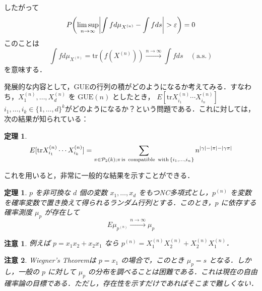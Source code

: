 \documentclass{ltjsarticle}
\makeatletter
\theoremstyle{mystyle1}
\newtheorem{thm}[dfn]{定理}
\theoremstyle{mystyle2}
\newtheorem{note*}{注意}
\theoremstyle{mystyle3}
\renewenvironment{proof}[1][\proofname]{\par
  \pushQED{\qed}%
  \normalfont
  \topsep6\p@\@plus6\p@ \trivlist
  \item[\hskip\labelsep{\bfseries\sffamily #1}]\ignorespaces
}{%
  \popQED\endtrivlist\@endpefalse
}
\renewcommand\proofname{証明}
\makeatother
\begin{document}
\begin{proof}
\begin{equation}
    \end{equation}
    したがって
    \begin{equation}
        P\mleft(\limsup_{n\to\infty}\mleft|\int f d\mu_{X^{(n)}}-\int f ds\mright|>\varepsilon\mright)=0
    \end{equation}
    このことは
    \begin{equation}
        \int f d\mu_{X^{(n)}}=\mathrm{tr}(f(X^{(n)}))\overset{n\to\infty}{\longrightarrow}\int f ds\quad(\textrm{a.s.})
    \end{equation}
    を意味する．
\end{proof}

発展的な内容として，GUEの行列の積がどのようになるか考えてみる．すなわち，$X_1^{(n)},\ldots,X_d^{(n)}$ を $\mathrm{GUE}(n)$ としたとき， $E[\mathrm{tr}X^{(n)}_{i_1}\cdots X^{(n)}_{i_n}]$ $i_1,\ldots,i_k\in\{1,\ldots, d\}^k$がどのようになるか？という問題である．これに対しては，次の結果が知られている：

\begin{thm}
    \begin{equation}
        E[\mathrm{tr}X^{(n)}_{i_1}\cdots X^{(n)}_{i_k}]=\sum_{\pi\in\mathcal{P}_2(k);\pi\, \textrm{is\, compatible\, with}\, \{i_1,\ldots,i_n\}} n^{|\gamma|-|\pi|-|\gamma\pi|}
    \end{equation}
\end{thm}

これを用いると，非常に一般的な結果を示すことができる．

\begin{thm}
    $p$ を非可換な $d$ 個の変数 $x_1,\ldots,x_d$ をもつNC多項式とし，$p^{(n)}$ を変数を確率変数で置き換えて得られるランダム行列とする．このとき，$p$ に依存する確率測度 $\mu_p$ が存在して
    \begin{equation}
        E\mu_{p^{(n)}}\overset{n\to\infty}{\longrightarrow}\mu_p
    \end{equation}
\end{thm}

\begin{note*}
    例えば $p=x_1x_2+x_2x_1$ なら $p^{(n)}=X_1^{(n)}X_2^{(n)}+X_2^{(n)}X_1^{(n)}$．
\end{note*}

\begin{note*}
    Wiegner's Theoremは $p=x_1$ の場合で，このとき $\mu_p=s$ となる．しかし，一般の $p$ に対して $\mu_p$ の分布を調べることは困難である．これは現在の自由確率論の目標である．ただし，存在性を示すだけであればそこまで難しくない．
\end{note*}
\end{document}
